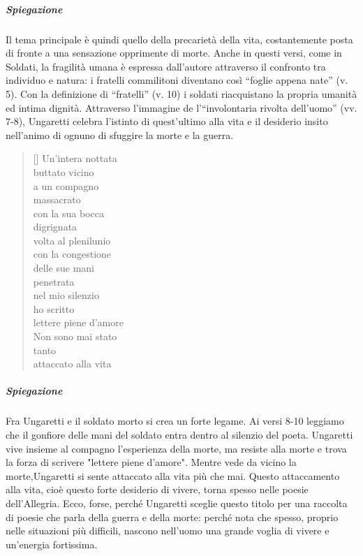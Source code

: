 \documentclass[10pt]{report}
\begin{document}
		\subparagraph[Fratelli]{Spiegazione}Il tema principale è quindi quello della precarietà della vita, costantemente posta di fronte a una sensazione opprimente di morte. Anche in questi versi, come in Soldati, la fragilità umana è espressa dall'autore attraverso il confronto tra individuo e natura: i fratelli commilitoni diventano così “foglie appena nate” (v. 5). Con la definizione di “fratelli” (v. 10) i soldati riacquistano la propria umanità ed intima dignità. Attraverso l'immagine de l'“involontaria rivolta dell'uomo” (vv. 7-8), Ungaretti celebra l'istinto di quest'ultimo alla vita e il desiderio insito nell'animo di ognuno di sfuggire la morte e la guerra.
		
	
		\renewcommand{\poemtoc}{subsection}
		\settowidth{\versewidth}{There was an old party of Lyme}
		
		\begin{verse}[\versewidth]
			Un'intera nottata \\
			buttato vicino \\
			a un compagno \\
			massacrato \\
			con la sua bocca \\
			digrignata \\
			volta al plenilunio \\
			con la congestione \\
			delle sue mani \\
			penetrata \\
			nel mio silenzio \\
			ho scritto \\
			lettere piene d'amore \\
			
			Non sono mai stato \\
			tanto \\
			attaccato alla vita\\
		\end{verse}
		
		\subparagraph[Veglia]{Spiegazione}Fra Ungaretti e il soldato morto
		si crea un forte legame. Ai versi 8-10 leggiamo che il	gonfiore delle mani del soldato entra dentro al silenzio del
		poeta. Ungaretti vive insieme al compagno l’esperienza della morte, ma resiste alla morte e trova la forza di scrivere
		"lettere piene d’amore". Mentre vede da vicino la morte,Ungaretti si sente attaccato alla vita più che mai. Questo
		attaccamento alla vita, cioè questo forte desiderio di vivere, torna spesso nelle poesie dell’Allegria. Ecco, forse,
		perché Ungaretti sceglie questo titolo per una raccolta di poesie che parla della guerra e della morte: perché nota
		che spesso, proprio nelle situazioni più difficili, nascono nell’uomo una grande voglia di vivere e un’energia fortissima.
		
\end{document}
